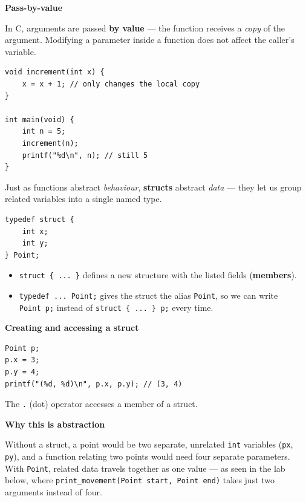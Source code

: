 \documentclass[11pt,a4paper]{article}
\providecommand{\tightlist}{\setlength{\itemsep}{0pt}\setlength{\parskip}{0pt}}
\begin{document}
\textbf{Pass-by-value}

In C, arguments are passed \textbf{by value} --- the function receives a \emph{copy} of the argument. Modifying a parameter inside a function does not affect the caller's variable.

\begin{lstlisting}[style=cscode]
void increment(int x) {
    x = x + 1; // only changes the local copy
}

int main(void) {
    int n = 5;
    increment(n);
    printf("%d\n", n); // still 5
}
\end{lstlisting}

\label{212-abstraction-of-data-structs}
\hypertarget{212-abstraction-of-data-structs}{}

Just as functions abstract \emph{behaviour}, \textbf{structs} abstract \emph{data} --- they let us group related variables into a single named type.

\begin{lstlisting}[style=cscode]
typedef struct {
    int x;
    int y;
} Point;
\end{lstlisting}

\begin{itemize}
\tightlist
\item
  \texttt{struct\ \{\ ...\ \}} defines a new structure with the listed fields (\textbf{members}).
\item
  \texttt{typedef\ ...\ Point;} gives the struct the alias \texttt{Point}, so we can write \texttt{Point\ p;} instead of \texttt{struct\ \{\ ...\ \}\ p;} every time.
\end{itemize}

\textbf{Creating and accessing a struct}

\begin{lstlisting}[style=cscode]
Point p;
p.x = 3;
p.y = 4;
printf("(%d, %d)\n", p.x, p.y); // (3, 4)
\end{lstlisting}

The \texttt{.} (dot) operator accesses a member of a struct.

\textbf{Why this is abstraction}

Without a struct, a point would be two separate, unrelated \texttt{int} variables (\texttt{px}, \texttt{py}), and a function relating two points would need four separate parameters. With \texttt{Point}, related data travels together as one value --- as seen in the lab below, where \texttt{print\_movement(Point\ start,\ Point\ end)} takes just two arguments instead of four.
\end{document}
